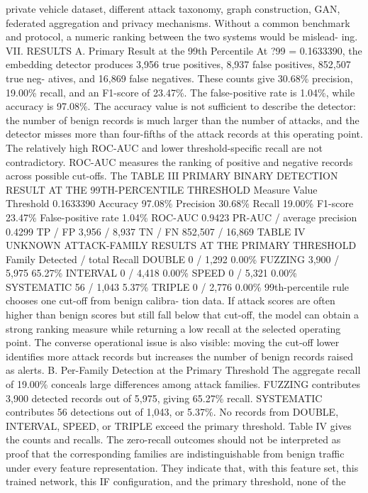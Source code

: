 \documentclass[
]{article}
\begin{document}
private vehicle dataset, different attack taxonomy, graph construction,
GAN, federated aggregation and privacy mechanisms. Without a common
benchmark and protocol, a numeric ranking between the two systems would
be mislead- ing. VII. RESULTS A. Primary Result at the 99th Percentile
At ?99 = 0.1633390, the embedding detector produces 3,956 true
positives, 8,937 false positives, 852,507 true neg- atives, and 16,869
false negatives. These counts give 30.68\% precision, 19.00\% recall,
and an F1-score of 23.47\%. The false-positive rate is 1.04\%, while
accuracy is 97.08\%. The accuracy value is not sufficient to describe
the detector: the number of benign records is much larger than the
number of attacks, and the detector misses more than four-fifths of the
attack records at this operating point. The relatively high ROC-AUC and
lower threshold-specific recall are not contradictory. ROC-AUC measures
the ranking of positive and negative records across possible cut-offs.
The TABLE III PRIMARY BINARY DETECTION RESULT AT THE 99TH-PERCENTILE
THRESHOLD Measure Value Threshold 0.1633390 Accuracy 97.08\% Precision
30.68\% Recall 19.00\% F1-score 23.47\% False-positive rate 1.04\%
ROC-AUC 0.9423 PR-AUC / average precision 0.4299 TP / FP 3,956 / 8,937
TN / FN 852,507 / 16,869 TABLE IV UNKNOWN ATTACK-FAMILY RESULTS AT THE
PRIMARY THRESHOLD Family Detected / total Recall DOUBLE 0 / 1,292 0.00\%
FUZZING 3,900 / 5,975 65.27\% INTERVAL 0 / 4,418 0.00\% SPEED 0 / 5,321
0.00\% SYSTEMATIC 56 / 1,043 5.37\% TRIPLE 0 / 2,776 0.00\%
99th-percentile rule chooses one cut-off from benign calibra- tion data.
If attack scores are often higher than benign scores but still fall
below that cut-off, the model can obtain a strong ranking measure while
returning a low recall at the selected operating point. The converse
operational issue is also visible: moving the cut-off lower identifies
more attack records but increases the number of benign records raised as
alerts. B. Per-Family Detection at the Primary Threshold The aggregate
recall of 19.00\% conceals large differences among attack families.
FUZZING contributes 3,900 detected records out of 5,975, giving 65.27\%
recall. SYSTEMATIC contributes 56 detections out of 1,043, or 5.37\%. No
records from DOUBLE, INTERVAL, SPEED, or TRIPLE exceed the primary
threshold. Table IV gives the counts and recalls. The zero-recall
outcomes should not be interpreted as proof that the corresponding
families are indistinguishable from benign traffic under every feature
representation. They indicate that, with this feature set, this trained
network, this IF configuration, and the primary threshold, none of the
\end{document}
